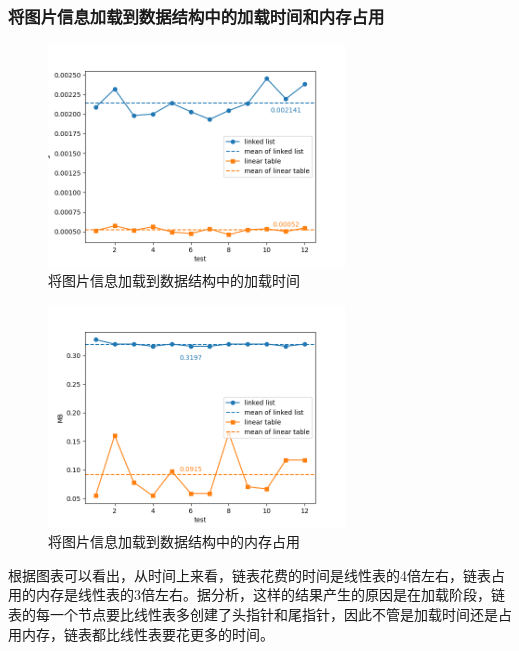 \subsubsection{将图片信息加载到数据结构中的加载时间和内存占用}
\begin{figure}[H]
	\centering
	\includegraphics[width=0.7\textwidth]{time1}  %
	\caption{将图片信息加载到数据结构中的加载时间}
	\label{fig:your_label}
\end{figure}
\begin{figure}[H]
	\centering
	\includegraphics[width=0.7\textwidth]{memory1}  %
	\caption{将图片信息加载到数据结构中的内存占用}
	\label{fig:your_label}
\end{figure}
根据图表可以看出，从时间上来看，链表花费的时间是线性表的4倍左右，链表占用的内存是线性表的3倍左右。据分析，这样的结果产生的原因是在加载阶段，链表的每一个节点要比线性表多创建了头指针和尾指针，因此不管是加载时间还是占用内存，链表都比线性表要花更多的时间。
